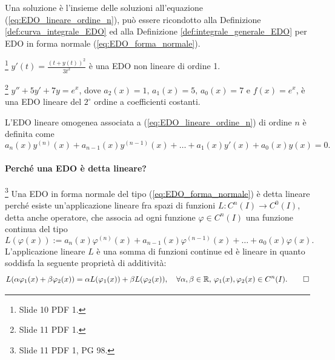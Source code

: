 Una soluzione è l'insieme delle soluzioni all'equazione (\ref{eq:EDO_lineare_ordine_n}), può essere ricondotto alla Definizione \ref{def:curva_integrale_EDO} ed alla Definizione \ref{def:integrale_generale_EDO} per EDO in forma normale (\ref{eq:EDO_forma_normale}).

\begin{example}
    \footnote{Slide 10 PDF 1.} $y'(t)=\frac{(t+y(t))^2}{3t^2}$ è una EDO non lineare di ordine 1. 
\end{example}

\begin{example}
    \footnote{Slide 11 PDF 1.} $y''+5y'+7y=e^x$, dove $a_2(x)=1,\, a_1(x)=5,\, a_0(x)=7$ e $f(x)=e^x$, è una EDO lineare del $2^\circ$ ordine a coefficienti costanti.
\end{example}

\begin{definition}\label{def:EDO_lineare_omogenea_ordine_n}
    L'EDO lineare omogenea associata a (\ref{eq:EDO_lineare_ordine_n}) di ordine $n$ è definita come
    \begin{equation}\label{eq:EDO_lineare_omogenea_associata_ordine_n}
        a_n(x)y^{(n)}(x)+a_{n-1}(x)y^{(n-1)}(x)+\hdots+a_1(x)y'(x)+a_0(x)y(x)=0.
    \end{equation}
\end{definition}

\paragraph{Perché una EDO è detta lineare?} \footnote{Slide 11 PDF 1, PG 98.} Una EDO in forma normale del tipo (\ref{eq:EDO_forma_normale}) è detta lineare perché esiste un'\gls{applicazione lineare} fra spazi di funzioni $L\colon C^n(I)\rightarrow C^0(I)$, detta anche operatore, che associa ad ogni funzione $\varphi\in C^n(I)$ una funzione continua del tipo
\begin{equation*}
    L(\varphi(x)):=a_n(x)\varphi^{(n)}(x)+a_{n-1}(x)\varphi^{(n-1)}(x)+\hdots+a_0(x)\varphi(x).
\end{equation*}
L'\gls{applicazione lineare} $L$ è una somma di funzioni continue ed è lineare in quanto soddisfa la seguente proprietà di additività:
\begin{equation*}
    L(\alpha\varphi_1(x)+\beta\varphi_2(x))=\alpha L(\varphi_1(x)) + \beta L(\varphi_2(x)),\quad\forall \alpha,\beta\in\mathbb R,\, \varphi_1(x),\varphi_2(x)\in C^n(I). \qed
\end{equation*}

